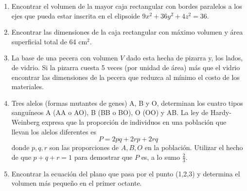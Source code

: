 \documentclass[fleqn, 12pt]{article}
\begin{document}
\begin{enumerate}
        \item Encontrar el volumen de la mayor caja rectangular con bordes paralelos a los ejes que pueda estar inscrita en el elipsoide $ 9x^2 + 36y^2 + 4z^2 = 36 $.
        

        \item Encontrar las dimensiones de la caja rectangular con máximo volumen y área superficial total de 64 cm$ ^2 $.
        

        \item La base de una pecera con volumen $ V $ dado esta hecha de pizarra y, los lados, de vidrio. Si la pizarra cuesta 5 veces (por unidad de área) más que el vidrio encontrar las dimensiones de la pecera que reduzca al mínimo el costo de los materiales.
        

        \item Tres alelos (formas mutantes de genes) A, B y O, determinan los cuatro tipos sanguíneos A (AA o AO), B (BB o BO), O (OO) y AB. La ley de Hardy-Weinberg expresa que la proporción de individuos en una población que llevan los alelos diferentes es
        $$ P = 2pq + 2rp + 2rq $$
        donde $ p, q, r $ son las proporciones de $ A, B, O $ en la población. Utilizar el hecho de que $ p + q + r = 1 $ para demostrar que $ P $ es, a lo sumo $ \frac{2}{3} $.


        \item Encontrar la ecuación del plano que pasa por el punto (1,2,3) y determina el volumen más pequeño en el primer octante.
        
    \end{enumerate}
\end{document}
